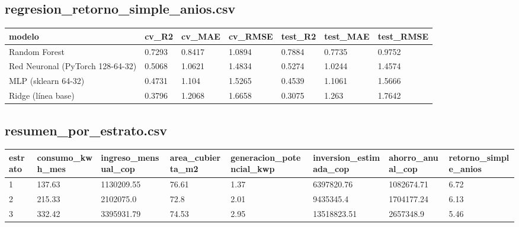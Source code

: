 \subsection*{regresion\_retorno\_simple\_anios.csv}
{\footnotesize\begin{longtable}{@{}p{}llllll@{}}
\toprule
modelo & cv\_R2 & cv\_MAE & cv\_RMSE & test\_R2 & test\_MAE & test\_RMSE \\
\midrule\endhead
Random Forest & 0.7293 & 0.8417 & 1.0894 & 0.7884 & 0.7735 & 0.9752 \\
Red Neuronal (PyTorch 128-64-32) & 0.5068 & 1.0621 & 1.4834 & 0.5274 & 1.0244 & 1.4574 \\
MLP (sklearn 64-32) & 0.4731 & 1.104 & 1.5265 & 0.4539 & 1.1061 & 1.5666 \\
Ridge (línea base) & 0.3796 & 1.2068 & 1.6658 & 0.3075 & 1.263 & 1.7642 \\
\bottomrule
\end{longtable}}
\subsection*{resumen\_por\_estrato.csv}
{\footnotesize\begin{longtable}{@{}llllp{}lll@{}}
\toprule
estrato & consumo\_kwh\_mes & ingreso\_mensual\_cop & area\_cubierta\_m2 & generacion\_potencial\_kwp & inversion\_estimada\_cop & ahorro\_anual\_cop & retorno\_simple\_anios \\
\midrule\endhead
1 & 137.63 & 1130209.55 & 76.61 & 1.37 & 6397820.76 & 1082674.71 & 6.72 \\
2 & 215.33 & 2102075.0 & 72.8 & 2.01 & 9435345.4 & 1704177.24 & 6.13 \\
3 & 332.42 & 3395931.79 & 74.53 & 2.95 & 13518823.51 & 2657348.9 & 5.46 \\
\bottomrule
\end{longtable}}
